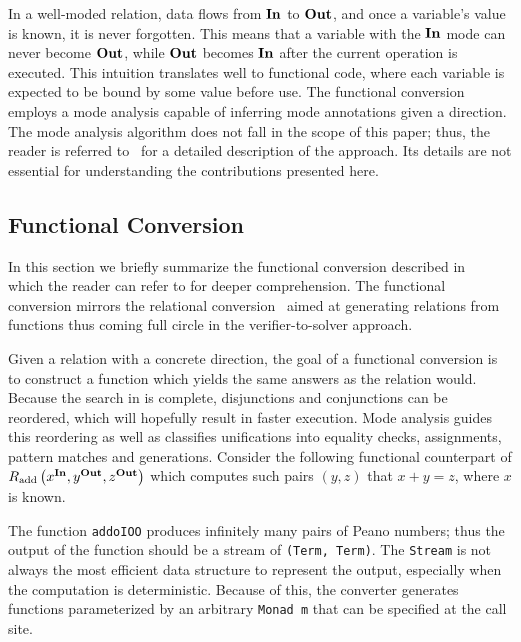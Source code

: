 In a well-moded relation, data flows from $\operatorname{\mathbf{In}}$ to $\operatorname{\mathbf{Out}}$, and once a variable's value is known, it is never forgotten.
This means that a variable with the $\operatorname{\mathbf{In}}$ mode can never become $\operatorname{\mathbf{Out}}$, while $\operatorname{\mathbf{Out}}$ becomes $\operatorname{\mathbf{In}}$ after the current operation is executed.
This intuition translates well to functional code, where each variable is expected to be bound by some value before use.
The functional conversion employs a mode analysis capable of inferring mode annotations given a direction.
The mode analysis algorithm does not fall in the scope of this paper; thus, the reader is referred to~\cite{engel2023translation} for a detailed description of the approach.
Its details are not essential for understanding the contributions presented here.

\subsection{Functional Conversion}

In this section we briefly summarize the functional conversion described in~\cite{engel2023translation} which the reader can refer to for deeper comprehension. 
The functional conversion mirrors the relational conversion~\cite{lozov2018typed} aimed at generating relations from functions thus coming full circle in the verifier-to-solver approach.

Given a \mk relation with a concrete direction, the goal of a functional conversion is to construct a function which yields the same answers as the relation would. 
Because the search in \mk is complete, disjunctions and conjunctions can be reordered, which will hopefully result in faster execution. 
Mode analysis guides this reordering as well as classifies unifications into equality checks, assignments, pattern matches and generations. 
Consider the following functional counterpart of $R_{\text{add}}\left( x^{\operatorname{\mathbf{In}}}, y^{\operatorname{\mathbf{Out}}}, z^{\operatorname{\mathbf{Out}}} \right)$ which computes such pairs $(y, z)$ that $x + y = z$, where $x$ is known. 


The function \lstinline{addoIOO} produces infinitely many pairs of Peano numbers; thus the output of the function should be a stream of \lstinline{(Term, Term)}. 
The \lstinline{Stream} is not always the most efficient data structure to represent the output, especially when the computation is deterministic. 
Because of this, the converter generates functions parameterized by an arbitrary \lstinline{Monad m} that can be specified at the call site. 

